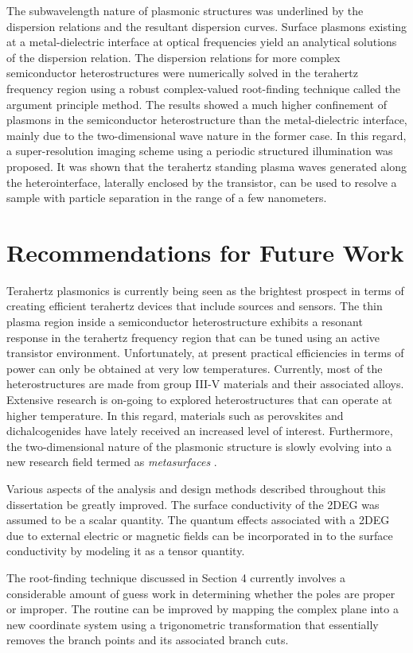 The subwavelength nature of plasmonic structures was underlined by the dispersion relations and the resultant dispersion curves. Surface plasmons existing at a metal-dielectric interface at optical frequencies yield an analytical solutions of the dispersion relation. The dispersion relations for more complex semiconductor heterostructures were numerically solved in the terahertz frequency region using a robust complex-valued root-finding technique called the argument principle method. The results showed a much higher confinement of plasmons in the semiconductor heterostructure than the metal-dielectric interface, mainly due to the two-dimensional wave nature in the former case. In this regard, a super-resolution imaging scheme using a periodic structured illumination was proposed. It was shown that the terahertz standing plasma waves generated along the heterointerface, laterally enclosed by the transistor, can be used to resolve a sample with particle separation in the range of a few nanometers.

\section{Recommendations for Future Work}
%
%
Terahertz plasmonics is currently being seen as the brightest prospect in terms of creating efficient terahertz devices that include sources and sensors. The thin plasma region inside a semiconductor heterostructure exhibits a resonant response in the terahertz frequency region that can be tuned using an active transistor environment. Unfortunately, at present practical efficiencies in terms of power can only be obtained at very low temperatures. Currently, most of the heterostructures are made from group III-V materials and their associated alloys. Extensive research is on-going to explored heterostructures that can operate at higher temperature. In this regard, materials such as perovskites and dichalcogenides have lately received an increased level of interest. Furthermore, the two-dimensional nature of the plasmonic structure is slowly evolving into a new research field termed as \emph{metasurfaces} \cite{Zhao_2011,Pors_2013}.

Various aspects of the analysis and design methods described throughout this dissertation be greatly improved. The surface conductivity of the 2DEG was assumed to be a scalar quantity. The quantum effects associated with a 2DEG due to external electric or magnetic fields can be incorporated in to the surface conductivity by modeling it as a tensor quantity.

The root-finding technique discussed in Section 4 currently involves a considerable amount of guess work in determining whether the poles are proper or improper. The routine can be improved by mapping the complex plane into a new coordinate system using a trigonometric transformation that essentially removes the branch points and its associated branch cuts.
